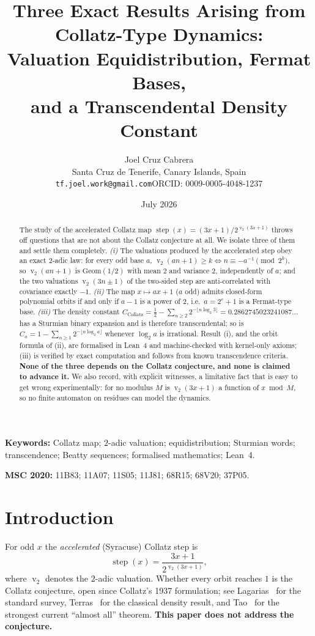 \documentclass[11pt,a4paper]{article}
\title{\bfseries Three Exact Results Arising from Collatz-Type Dynamics:\\
Valuation Equidistribution, Fermat Bases,\\ and a Transcendental Density Constant}
\author{Joel Cruz Cabrera\\
\small Santa Cruz de Tenerife, Canary Islands, Spain\\
\small\texttt{tf.joel.work@gmail.com}\quad ORCID: 0009-0005-4048-1237}
\date{July 2026}
\theoremstyle{plain}
\theoremstyle{definition}
\newcommand{\val}{\operatorname{v}_2}
\newcommand{\step}{\operatorname{step}}
\newcommand{\CC}{C_{\mathrm{Collatz}}}
\begin{document}
\maketitle

\begin{abstract}
The study of the accelerated Collatz map $\step(x)=(3x+1)/2^{\val(3x+1)}$ throws off
questions that are not about the Collatz conjecture at all. We isolate three of them and
settle them completely.
\emph{(i)} The valuations produced by the accelerated step obey an exact $2$-adic law: for
every odd base $a$, $\val(an+1)\ge k \iff n\equiv-a^{-1}\pmod{2^{k}}$, so $\val(an+1)$ is
$\mathrm{Geom}(1/2)$ with mean $2$ and variance $2$, independently of $a$; and the two
valuations $\val(3n\pm1)$ of the two-sided step are anti-correlated with covariance exactly
$-1$.
\emph{(ii)} The map $x\mapsto ax+1$ ($a$ odd) admits closed-form polynomial orbits if and only
if $a-1$ is a power of $2$, i.e.\ $a=2^{e}+1$ is a Fermat-type base.
\emph{(iii)} The density constant $\CC=\frac12-\sum_{n\ge2}2^{-\lfloor n\log_{2}3\rfloor}
=0.2862745023241087\ldots$ has a Sturmian binary expansion and is therefore transcendental;
so is $C_{a}=1-\sum_{n\ge1}2^{-\lfloor n\log_{2}a\rfloor}$ whenever $\log_{2}a$ is irrational.
Result (i), and the orbit formula of (ii), are formalised in Lean~4 and machine-checked with
kernel-only axioms;
(iii) is verified by exact computation and follows from known transcendence criteria.
\textbf{None of the three depends on the Collatz conjecture, and none is claimed to advance
it.} We also record, with explicit witnesses, a limitative fact that is easy to get wrong
experimentally: for no modulus $M$ is $\val(3x+1)$ a function of $x\bmod M$, so no finite
automaton on residues can model the dynamics.
\end{abstract}

\noindent\textbf{Keywords:} Collatz map; $2$-adic valuation; equidistribution; Sturmian
words; transcendence; Beatty sequences; formalised mathematics; Lean~4.

\noindent\textbf{MSC 2020:} 11B83; 11A07; 11S05; 11J81; 68R15; 68V20; 37P05.

\section{Introduction}

For odd $x$ the \emph{accelerated} (Syracuse) Collatz step is
\begin{equation}\label{eq:step}
  \step(x)=\frac{3x+1}{2^{\val(3x+1)}},
\end{equation}
where $\val$ denotes the $2$-adic valuation. Whether every orbit reaches $1$ is the Collatz
conjecture, open since Collatz's 1937 formulation; see Lagarias~\cite{lagarias,lagarias-book}
for the standard survey, Terras~\cite{terras} for the classical density result, and
Tao~\cite{tao} for the strongest current ``almost all'' theorem. \textbf{This paper does not
address the conjecture.}
\end{document}
